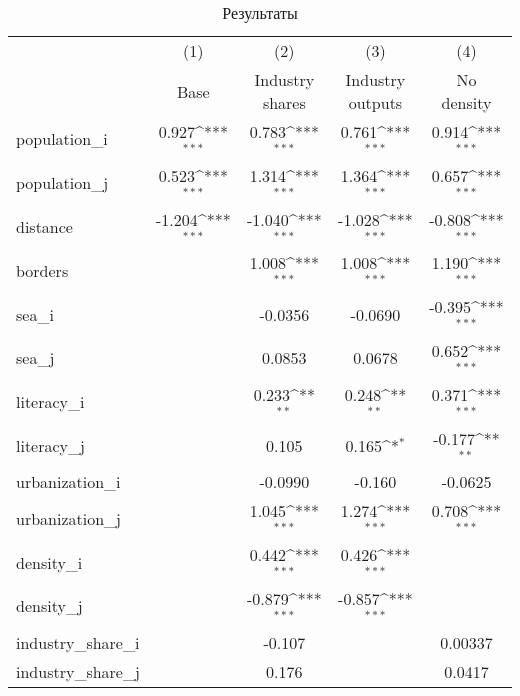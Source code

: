 {
\def\sym#1{\ifmmode^{#1}\else\(^{#1}\)\fi}
\begin{longtable}{l*{4}{c}}
\caption{Результаты\label{table:res}}\\
\hline\hline\endfirsthead\hline\endhead\hline\endfoot\endlastfoot
                    &\multicolumn{1}{c}{(1)}&\multicolumn{1}{c}{(2)}&\multicolumn{1}{c}{(3)}&\multicolumn{1}{c}{(4)}\\
                    &\multicolumn{1}{c}{Base}&\multicolumn{1}{c}{Industry shares}&\multicolumn{1}{c}{Industry outputs}&\multicolumn{1}{c}{No density}\\
\hline
population\_i        &       0.927\sym{***}&       0.783\sym{***}&       0.761\sym{***}&       0.914\sym{***}\\
population\_j        &       0.523\sym{***}&       1.314\sym{***}&       1.364\sym{***}&       0.657\sym{***}\\
distance            &      -1.204\sym{***}&      -1.040\sym{***}&      -1.028\sym{***}&      -0.808\sym{***}\\
borders             &                     &       1.008\sym{***}&       1.008\sym{***}&       1.190\sym{***}\\
sea\_i               &                     &     -0.0356         &     -0.0690         &      -0.395\sym{***}\\
sea\_j               &                     &      0.0853         &      0.0678         &       0.652\sym{***}\\
literacy\_i          &                     &       0.233\sym{**} &       0.248\sym{**} &       0.371\sym{***}\\
literacy\_j          &                     &       0.105         &       0.165\sym{*}  &      -0.177\sym{**} \\
urbanization\_i      &                     &     -0.0990         &      -0.160         &     -0.0625         \\
urbanization\_j      &                     &       1.045\sym{***}&       1.274\sym{***}&       0.708\sym{***}\\
density\_i           &                     &       0.442\sym{***}&       0.426\sym{***}&                     \\
density\_j           &                     &      -0.879\sym{***}&      -0.857\sym{***}&                     \\
industry\_share\_i    &                     &      -0.107         &                     &     0.00337         \\
industry\_share\_j    &                     &       0.176         &                     &      0.0417         \\

\end{longtable}}
